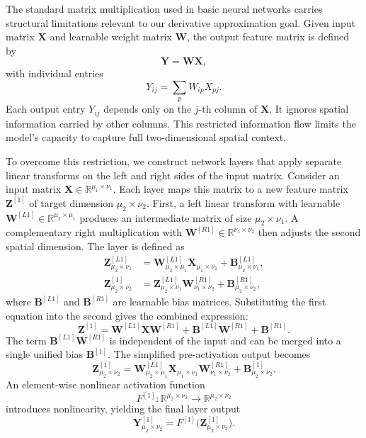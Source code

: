 \documentclass[pdflatex,sn-mathphys-num]{sn-jnl}%
\theoremstyle{thmstyleone}%
\theoremstyle{thmstyletwo}%
\theoremstyle{thmstylethree}%
\begin{document}
The standard matrix multiplication used in basic neural networks carries structural limitations relevant to our derivative approximation goal. Given input matrix $\boldsymbol{X}$ and learnable weight matrix $\boldsymbol{W}$, the output feature matrix is defined by
\[
\boldsymbol{Y} = \boldsymbol{W}\boldsymbol{X},
\]
with individual entries
\[
Y_{ij} = \sum_{p} W_{ip} X_{pj}.
\]
Each output entry $Y_{ij}$ depends only on the $j$-th column of $\boldsymbol{X}$. It ignores spatial information carried by other columns. This restricted information flow limits the model’s capacity to capture full two-dimensional spatial context.

To overcome this restriction, we construct network layers that apply separate linear transforms on the left and right sides of the input matrix. Consider an input matrix $\boldsymbol{X} \in \mathbb{R}^{\mu_1 \times \nu_1}$. Each layer maps this matrix to a new feature matrix $\boldsymbol{Z}^{[1]}$ of target dimension $\mu_2 \times \nu_2$. First, a left linear transform with learnable $\boldsymbol{W}^{[L1]} \in \mathbb{R}^{\mu_2 \times \mu_1}$ produces an intermediate matrix of size $\mu_2 \times \nu_1$. A complementary right multiplication with $\boldsymbol{W}^{[R1]} \in \mathbb{R}^{\nu_1 \times \nu_2}$ then adjusts the second spatial dimension. The layer is defined as
\begin{align}
\boldsymbol{Z}^{[L1]}_{\mu_2 \times \nu_1} &= \boldsymbol{W}^{[L1]}_{\mu_2 \times \mu_1} \boldsymbol{X}_{\mu_1 \times \nu_1} + \boldsymbol{B}^{[L1]}_{\mu_2 \times \nu_1}, \\
\boldsymbol{Z}^{[1]}_{\mu_2 \times \nu_2}  &= \boldsymbol{Z}^{[L1]}_{\mu_2 \times \nu_1} \boldsymbol{W}^{[R1]}_{\nu_1 \times \nu_2} + \boldsymbol{B}^{[R1]}_{\mu_2 \times \nu_2},
\end{align}
where $\boldsymbol{B}^{[L1]}$ and $\boldsymbol{B}^{[R1]}$ are learnable bias matrices. Substituting the first equation into the second gives the combined expression:
\[
\boldsymbol{Z}^{[1]}
=
\boldsymbol{W}^{[L1]} \boldsymbol{X} \boldsymbol{W}^{[R1]}
+ \boldsymbol{B}^{[L1]} \boldsymbol{W}^{[R1]}
+ \boldsymbol{B}^{[R1]}.
\]
The term $\boldsymbol{B}^{[L1]} \boldsymbol{W}^{[R1]}$ is independent of the input and can be merged into a single unified bias $\boldsymbol{B}^{[1]}$. The simplified pre-activation output becomes
\begin{equation}\label{6E}
\boldsymbol{Z}^{[1]}_{\mu_2 \times \nu_2}
=
\boldsymbol{W}^{[L1]}_{\mu_2 \times \mu_1}
\boldsymbol{X}_{\mu_1 \times \nu_1}
\boldsymbol{W}^{[R1]}_{\nu_1 \times \nu_2}
+ \boldsymbol{B}^{[1]}_{\mu_2 \times \nu_2}.
\end{equation}
An element-wise nonlinear activation function
\[
F^{[1]}: \mathbb{R}^{\mu_2 \times \nu_2} \to \mathbb{R}^{\mu_2 \times \nu_2}
\]
introduces nonlinearity, yielding the final layer output
\begin{equation}
\boldsymbol{Y}^{[1]}_{\mu_2 \times \nu_2}
=
F^{[1]}\bigl(\boldsymbol{Z}^{[1]}_{\mu_2 \times \nu_2}\bigr).
\end{equation}
\end{document}
